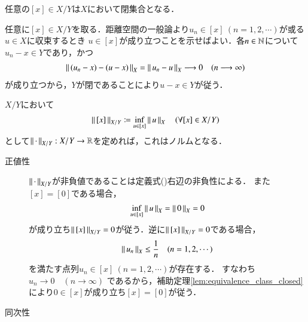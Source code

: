 	\begin{screen}
		\begin{lem}[同値類は閉]
			任意の$[x] \in X/Y$は$X$において閉集合となる．
			\label{lem:equivalence_class_closed}
		\end{lem}
	\end{screen}
	
	\begin{prf}
		任意に$[x] \in X/Y$を取る．距離空間の一般論より$u_n \in [x]\ (n=1,2,\cdots)$が或る$u \in X$に収束するとき
		$u \in [x]$が成り立つことを示せばよい．各$n \in \mathbb{N}$について$u_n - x \in Y$であり，かつ
		\begin{align}
			\left\|\, (u_n - x) - (u - x)\, \right\|_{X} = \left\|\, u_n - u\, \right\|_{X} \longrightarrow 0
			\quad (n \longrightarrow \infty)
		\end{align}
		が成り立つから，$Y$が閉であることにより$u - x \in Y$が従う．
		\QED
	\end{prf}
	
	\begin{screen}
		\begin{thm}[商空間におけるノルムの定義]
			$X/Y$において
			\begin{align}
				\left\|\, [x]\, \right\|_{X/Y} \coloneqq \operatorname*{inf}_{u \in [x]} \left\|\, u\, \right\|_{X} \quad (\forall [x] \in X/Y)
				\label{eq:thm_quotient_space_norm}
			\end{align}
			として$\left\|\, \cdot\, \right\|_{X/Y}:X/Y \rightarrow \mathbb{R}$を定めれば，これはノルムとなる．
		\end{thm}
	\end{screen}
	
	\begin{prf}\mbox{}
		\begin{description}
			\item[正値性]
				$\left\|\, \cdot\, \right\|_{X/Y}$が非負値であることは定義式()右辺の非負性による．
				また$[x] = [0]$である場合，
				\begin{align}
					\operatorname*{inf}_{u \in [x]} \left\|\, u\, \right\|_{X} = \left\|\, 0\, \right\|_{X} = 0
				\end{align}
				が成り立ち$\left\|\, [x]\, \right\|_{X/Y} = 0$が従う．逆に$\left\|\, [x]\, \right\|_{X/Y} = 0$である場合，
				\begin{align}
					\left\|\, u_n\, \right\|_{X} \leq \frac{1}{n} \quad (n=1,2,\cdots)
				\end{align}
				を満たす点列$u_n \in [x]\ (n=1,2,\cdots)$が存在する．
				すなわち$u_n \longrightarrow 0 \quad (n \longrightarrow \infty)$
				であるから，補助定理\ref{lem:equivalence_class_closed}により$0 \in [x]$が成り立ち$[x] = [0]$が従う．
				
			\item[同次性]
				
		\end{description}
	\end{prf}